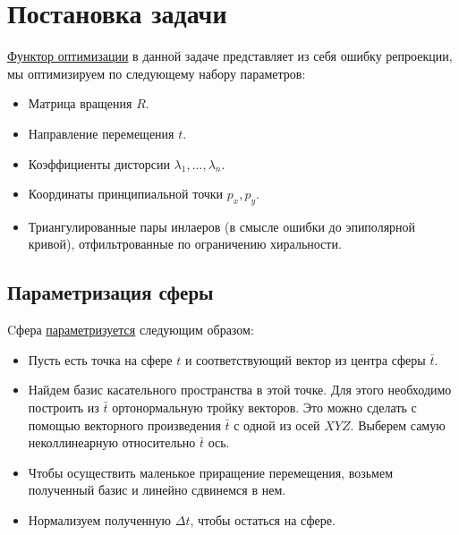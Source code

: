 \label{bundle_adj}
\section{Постановка задачи}
\href{https://github.com/QuantumMechanicus/camera_calibration_test/blob/dev/subroutines/global_non_linear_optimizer/Global_Non_Linear_Estimator.h#L30}{Функтор оптимизации} в данной задаче представляет из себя ошибку репроекции, мы оптимизируем по следующему набору параметров:
\begin{itemize}
	\item Матрица вращения $R$.
	\item Направление перемещения $t$.
	\item Коэффициенты дисторсии $\lambda_1,...,\lambda_n$.
	\item Координаты принципиальной точки $p_x, p_y$.
	\item Триангулированные пары инлаеров (в смысле ошибки до эпиполярной кривой), отфильтрованные по ограничению хиральности.
\end{itemize}	 
\subsection{Параметризация сферы}
Cфера \href{https://github.com/QuantumMechanicus/camera_calibration_test/blob/dev/core/utils/Local_Parametrization_Sphere.h}{параметризуется} следующим образом:
\begin{itemize}
	\item Пусть есть точка на сфере $t$ и соответствующий вектор из центра сферы $\bar{t}$.
	\item Найдем базис касательного пространства в этой точке. Для этого необходимо построить из $\bar{t}$ ортонормальную тройку векторов. Это можно сделать с помощью векторного произведения $\bar{t}$ с одной из осей $XYZ$. Выберем самую неколлинеарную относительно $\bar{t}$ ось. 
	\item Чтобы осуществить маленькое приращение перемещения, возьмем полученный базис и линейно сдвинемся в нем.
	\item Нормализуем полученную $\Delta t$, чтобы остаться на сфере.    
\end{itemize} 
\pagebreak
